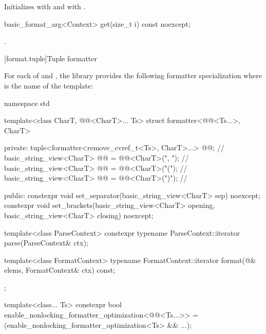 \begin{itemdescr}
\pnum
\effects
Initializes
 with  and
 with .
\end{itemdescr}

%
\begin{itemdecl}
basic_format_arg<Context> get(size_t i) const noexcept;
\end{itemdecl}

\begin{itemdescr}
\pnum
\returns
{}.
\end{itemdescr}

[format.tuple]{Tuple formatter}

\pnum
For each of  and ,
the library provides the following formatter specialization
where  is the name of the template:

%
\begin{codeblock}
namespace std {
  template<class CharT, @@<CharT>... Ts>
  struct formatter<@@<Ts...>, CharT> {
  private:
    tuple<formatter<remove_cvref_t<Ts>, CharT>...> @@;               // \expos
    basic_string_view<CharT> @@ = @@<CharT>(", ");      // \expos
    basic_string_view<CharT> @@ = @@<CharT>("("); // \expos
    basic_string_view<CharT> @@ = @@<CharT>(")"); // \expos

  public:
    constexpr void set_separator(basic_string_view<CharT> sep) noexcept;
    constexpr void set_brackets(basic_string_view<CharT> opening,
                                basic_string_view<CharT> closing) noexcept;

    template<class ParseContext>
      constexpr typename ParseContext::iterator
        parse(ParseContext& ctx);

    template<class FormatContext>
      typename FormatContext::iterator
        format(@\seebelow@& elems, FormatContext& ctx) const;
  };

  template<class... Ts>
    constexpr bool enable_nonlocking_formatter_optimization<@@<Ts...>> =
      (enable_nonlocking_formatter_optimization<Ts> && ...);
}
\end{codeblock}

